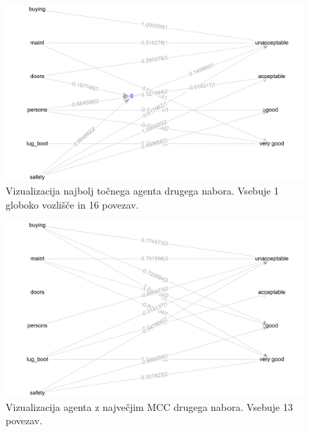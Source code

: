 \begin{figure}[H]
    \begin{center}
        \includegraphics[width=13cm]{car/2/acc_g}
    \end{center}
    \caption{Vizualizacija najbolj točnega agenta drugega nabora. Vsebuje 1 globoko vozlišče in 16 povezav.}
    \label{fig:car_acc_2_g}
\end{figure}

\begin{figure}[H]
    \begin{center}
        \includegraphics[width=13cm]{car/2/mcc_g}
    \end{center}
    \caption{Vizualizacija agenta z največjim MCC drugega nabora. Vsebuje 13 povezav.}
    \label{fig:car_mcc_2_g}
\end{figure}

